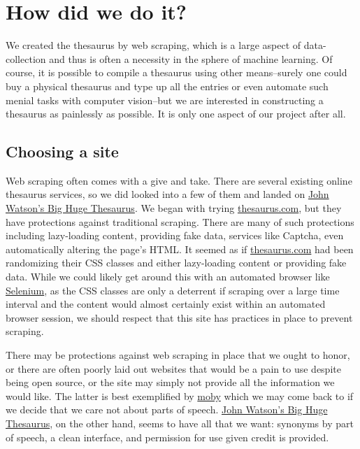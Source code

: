\documentclass[11pt, twoside, reqno]{book}
\begin{document}
\section{How did we do it?}

We created the thesaurus by web scraping, which is a large aspect of data-collection and thus is often a necessity in the sphere of machine learning. Of course, it is possible to compile a thesaurus using other means--surely one could buy a physical thesaurus and type up all the entries or even automate such menial tasks with computer vision--but we are interested in constructing a thesaurus as painlessly as possible. It is only one aspect of our project after all.

\subsection{Choosing a site}

Web scraping often comes with a give and take. There are several existing online thesaurus services, so we did looked into a few of them and landed on \href{https://words.bighugelabs.com}{John Watson's Big Huge Thesaurus}. We began with trying \href{https://www.thesaurus.com}{thesaurus.com}, but they have protections against traditional scraping. There are many of such protections including lazy-loading content, providing fake data, services like Captcha, even automatically altering the page's HTML. It seemed as if \href{https://www.thesaurus.com}{thesaurus.com} had been randomizing their CSS classes and either lazy-loading content or providing fake data. While we could likely get around this with an automated browser like \href{https://www.seleniumhq.org/}{Selenium}, as the CSS classes are only a deterrent if scraping over a large time interval and the content would almost certainly exist within an automated browser session, we should respect that this site has practices in place to prevent scraping.

There may be protections against web scraping in place that we ought to honor, or there are often poorly laid out websites that would be a pain to use despite being open source, or the site may simply not provide all the information we would like. The latter is best exemplified by \href{http://moby-thesaurus.org}{moby} which we may come back to if we decide that we care not about parts of speech. \href{https://words.bighugelabs.com}{John Watson's Big Huge Thesaurus}, on the other hand, seems to have all that we want: synonyms by part of speech, a clean interface, and permission for use given credit is provided.
\end{document}
